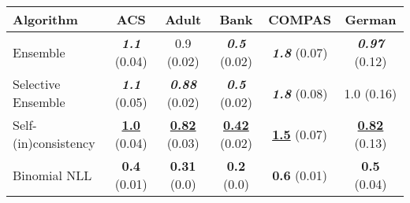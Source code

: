 \begin{tabular} {|l|c|c|c|c|c|}
\hline
\textbf{Algorithm} & \textbf{ACS} & \textbf{Adult} & \textbf{Bank} & \textbf{COMPAS} & \textbf{German} \\ \hline
Ensemble & \textbf{\textit{1.1}} (0.04) & 0.9 (0.02) & \textbf{\textit{0.5}} (0.02) & \textbf{\textit{1.8}} (0.07) & \textbf{\textit{0.97}} (0.12) \\ \hline 
Selective Ensemble & \textbf{\textit{1.1}} (0.05) & \textbf{\textit{0.88}} (0.02) & \textbf{\textit{0.5}} (0.02) & \textbf{\textit{1.8}} (0.08) & 1.0 (0.16) \\ \hline 
Self-(in)consistency & \textbf{\underline{1.0}} (0.04) & \textbf{\underline{0.82}} (0.03) & \textbf{\underline{0.42}} (0.02) & \textbf{\underline{1.5}} (0.07) & \textbf{\underline{0.82}} (0.13) \\ \hline 
Binomial NLL & \textbf{0.4} (0.01) & \textbf{0.31} (0.0) & \textbf{0.2} (0.0) & \textbf{0.6} (0.01) & \textbf{0.5} (0.04) \\ \hline 
\end{tabular}